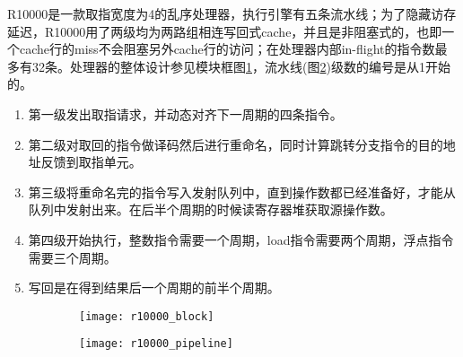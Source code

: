 R10000是一款取指宽度为4的乱序处理器，执行引擎有五条流水线；为了隐藏访存延迟，R10000用了两级均为两路组相连写回式cache，并且是非阻塞式的，也即一个cache行的miss不会阻塞另外cache行的访问；在处理器内部in-flight的指令数最多有32条\citep{MIPS1996}。处理器的整体设计参见模块框图\ref{fig:r10000_block}，流水线(图\ref{fig:r10000_pipeline})级数的编号是从1开始的。
\begin{enumerate}[label=(\arabic*)]
	\item 第一级发出取指请求，并动态对齐下一周期的四条指令。
	\item 第二级对取回的指令做译码然后进行重命名，同时计算跳转分支指令的目的地址反馈到取指单元。
	\item 第三级将重命名完的指令写入发射队列中，直到操作数都已经准备好，才能从队列中发射出来。在后半个周期的时候读寄存器堆获取源操作数。
	\item 第四级开始执行，整数指令需要一个周期，load指令需要两个周期，浮点指令需要三个周期。
	\item 写回是在得到结果后一个周期的前半个周期。
\end{enumerate}
\begin{figure}[!htbp]
\centering
\begin{subfigure}[b]{\textwidth}
	\texttt{[image: r10000\_block]}
	\caption{}
	\label{fig:r10000_block}
\end{subfigure}
\begin{subfigure}[b]{\textwidth}
	\texttt{[image: r10000\_pipeline]}
	\caption{}
	\label{fig:r10000_pipeline}
\end{subfigure}
\label{fig:r10000_total}
\end{figure}

